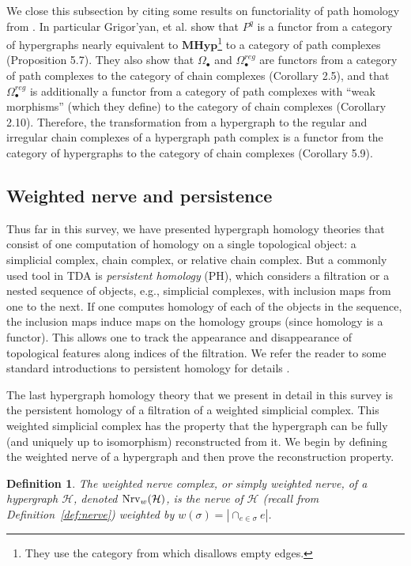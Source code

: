 \documentclass{amsart}
\newtheorem{definition}[theorem]{Definition}
\newcommand{\MHyp}{\mathrm{\textbf{MHyp}}}
\renewcommand{\H}{\mathcal{H}}
\newcommand{\Nrv}{\mm{\mathrm{Nrv}}}
\newcommand {\mm}[1]        {\ifmmode{#1}\else{\mbox{\(#1\)}}\fi}
\begin{document}
We close this subsection by citing some results on functoriality of path homology from \cite{GrigoryanJimenezMuranov2019}. In particular Grigor'yan, et al. show that $P^q$ is a functor from a category of hypergraphs nearly equivalent to $\MHyp$\footnote{They use the category from \cite{dorfler1980category} which disallows empty edges.} to a category of path complexes (Proposition 5.7). They also show that $\Omega_\bullet$ and $\Omega^{reg}_\bullet$ are functors from a category of path complexes to the category of chain complexes (Corollary 2.5), and that $\Omega^{reg}_\bullet$ is additionally a functor from a category of path complexes with ``weak morphisms'' (which they define) to the category of chain complexes (Corollary 2.10). Therefore, the transformation from a hypergraph to the regular and irregular chain complexes of a hypergraph path complex is a functor from the category of hypergraphs to the category of chain complexes (Corollary 5.9).




%

%


\subsection{Weighted nerve and persistence} 
\label{sec:weighted}

Thus far in this survey, we have presented hypergraph homology theories that consist of one computation of homology on a single topological object: a simplicial complex, chain complex, or relative chain complex. But a commonly used tool in TDA is \emph{persistent homology} (PH), which considers a filtration or a nested sequence of objects, e.g., simplicial complexes, with inclusion maps from one to the next. If one computes homology of each of the objects in the sequence, the inclusion maps induce maps on the homology groups (since homology is a functor). This allows one to track the appearance and disappearance of topological features along indices of the filtration. We refer the reader to some standard introductions to persistent homology for details \cite{Carlsson2009TopologyAD,dey2022computational, edelsbrunner2010computational, EdelsbrunnerLetscherZomorodian2002,ghrist2014elementary, zomorodian2005computing}. 

The last hypergraph homology theory that we present in detail in this survey is the persistent homology of a filtration of a weighted simplicial complex. This weighted simplicial complex has the property that the hypergraph can be fully (and uniquely up to isomorphism) reconstructed from it.
We begin by defining the weighted nerve of a hypergraph and then prove the reconstruction property.
\begin{definition}\label{def:wtd_nrv}
The \emph{weighted nerve complex}, or simply \emph{weighted nerve}, of a hypergraph $\H$, denoted $\Nrv_w(\H)$, is the nerve of $\H$ (recall from Definition~\ref{def:nerve}) weighted by $w(\sigma) = |\cap_{e \in \sigma} e|$.
\end{definition}
\end{document}
